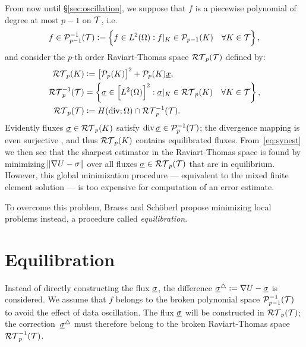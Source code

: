 \documentclass[thesis.tex]{subfiles}
\begin{document}
From now until \S\ref{sec:oscillation}, we suppose that $f$ is a piecewise polynomial of degree at most $p-1$ on $\mathcal{T}$, i.e.
\[
  f\in \mathcal{P}_{p-1}^{-1}(\mathcal{T}) := \set{ f \in L^2(\Omega): f|_K \in \mathcal{P}_{p-1}(K) \quad \forall K \in \mathcal{T}},
\]
and consider the  $p$-th order Raviart-Thomas space $\mathcal{RT}_p(\mathcal{T})$ defined by:
\begin{align*} 
  \mathcal{RT}_p(K)    &:= \left[ \mathcal{P}_p(K)\right]^2 + \mathcal{P}_p(K)\underline{x}, \\
  \mathcal{RT}_p^{-1}(\mathcal{T}) &= \set{ \underline{\sigma} \in \left[L^2(\Omega)\right]^2 : \underline{\sigma}|_K \in \mathcal{RT}_p(K) \quad \forall K \in \mathcal{T}},\\
  \mathcal{RT}_p(\mathcal{T}) &:= H(\operatorname{div}; \Omega) \cap \mathcal{RT}_p^{-1}(\mathcal{T}).
\end{align*}
Evidently fluxes $\underline{\sigma} \in \mathcal{RT}_p(K)$ satisfy $\operatorname{div} \underline{\sigma} \in \mathcal{P}_p^{-1}(\mathcal{T})$; the divergence mapping
is even surjective \cite[Prop~2.3.3]{brezzimixed}, and thus $\mathcal{RT}_p(K)$ contains equilibrated fluxes.
 From~\eqref{eq:synest} we then see that 
the sharpest estimator in the Raviart-Thomas space is found by minimizing $\norm{\nabla U - \sigma}$ over all 
fluxes $\underline{\sigma} \in \mathcal{RT}_p(\mathcal{T})$ that are in equilibrium. However,
this global minimization procedure --- equivalent to the mixed finite element solution \cite{braess2007finite} --- 
is too expensive for computation of an error estimate.

To overcome this problem, Braess and Sch\"oberl \cite{braessequil} propose minimizing local problems instead, a procedure
called \emph{equilibration}.

\section{Equilibration} 
Instead of directly constructing the flux $\underline{\sigma}$, the difference $\underline{\sigma}^\triangle := \nabla U -  \underline{\sigma}$ is considered.
We assume that $f$ belongs to the broken polynomial space $\mathcal{P}_{p-1}^{-1}(\mathcal{T})$ to avoid the effect of
data oscillation.  The flux $\underline{\sigma}$ will be constructed in $\mathcal{RT}_p(\mathcal{T})$; the correction~$\underline{\sigma}^\triangle$ must 
therefore belong to the broken Raviart-Thomas space $\mathcal{RT}_p^{-1}(\mathcal{T})$.
\end{document}
